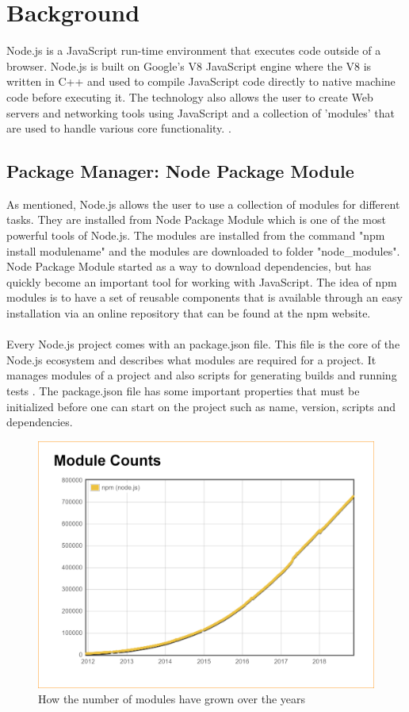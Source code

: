 \section{Background}
\label{sec:background}
Node.js is a JavaScript run-time environment that executes code outside of a browser. Node.js is built on Google's V8 JavaScript engine where the V8 is written in C++ and used to compile JavaScript code directly to native machine code before executing it. 
The technology also allows the user to create Web servers and networking tools using JavaScript and a collection of 'modules' that are used to handle various core functionality. 
\cite{wiki:nodejs}.

\subsection{Package Manager: Node Package Module}
As mentioned, Node.js allows the user to use a collection of modules for different tasks. They are installed from Node Package Module which is one of the most powerful tools of Node.js. The modules are installed from the command "npm install modulename" and the modules are downloaded to folder "{node\_modules}". Node Package Module started as a way to download dependencies, but has quickly become an important tool for working with JavaScript. The idea of npm modules is to have a set of reusable components that is available through an easy installation via an online repository that can be found at the npm website. \cite{npm:webpage}
\\\\
Every Node.js project comes with an package.json file. This file is the core of the Node.js ecosystem and describes what modules are required for a project. It manages modules of a project and also scripts for generating builds and running tests \cite{npmjs:modules}. 
The package.json file has some important properties that must be initialized before one can start on the project such as name, version, scripts and dependencies. 
\begin{figure}[h!]
  \centering
  \includegraphics[scale=0.5]{figs/npmmodulescounts.png}
  \caption{How the number of modules have grown over the years \cite{image:modulecount}}
\end{figure}\\
